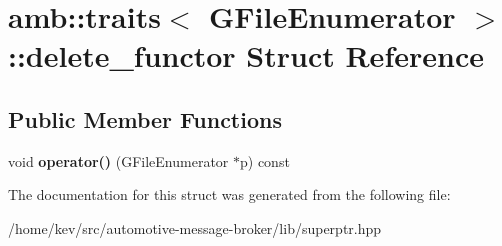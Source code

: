 \hypertarget{structamb_1_1traits_3_01GFileEnumerator_01_4_1_1delete__functor}{\section{amb\+:\+:traits$<$ G\+File\+Enumerator $>$\+:\+:delete\+\_\+functor Struct Reference}
\label{structamb_1_1traits_3_01GFileEnumerator_01_4_1_1delete__functor}
}
\subsection*{Public Member Functions}
\begin{DoxyCompactItemize}
\item 
\hypertarget{structamb_1_1traits_3_01GFileEnumerator_01_4_1_1delete__functor_acb541f47b0597b432c025dceb89f044b}{void {\bfseries operator()} (G\+File\+Enumerator $\ast$p) const }\label{structamb_1_1traits_3_01GFileEnumerator_01_4_1_1delete__functor_acb541f47b0597b432c025dceb89f044b}

\end{DoxyCompactItemize}


The documentation for this struct was generated from the following file\+:\begin{DoxyCompactItemize}
\item 
/home/kev/src/automotive-\/message-\/broker/lib/superptr.\+hpp\end{DoxyCompactItemize}
